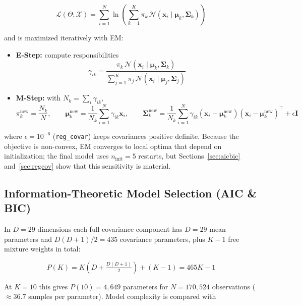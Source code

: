 \documentclass[11pt, a4paper]{article}
\begin{document}
\begin{equation}
\mathcal{L}(\Theta; \mathcal{X}) = \sum_{i=1}^{N} \ln \left( \sum_{k=1}^{K} \pi_k \, \mathcal{N}(\mathbf{x}_i \mid \boldsymbol{\mu}_k, \boldsymbol{\Sigma}_k) \right)
\end{equation}

and is maximized iteratively with EM:
\begin{itemize}
    \item \textbf{E-Step:} compute responsibilities
    \begin{equation}
    \gamma_{ik} = \frac{\pi_k \, \mathcal{N}(\mathbf{x}_i \mid \boldsymbol{\mu}_k, \boldsymbol{\Sigma}_k)}{\sum_{j=1}^{K} \pi_j \, \mathcal{N}(\mathbf{x}_i \mid \boldsymbol{\mu}_j, \boldsymbol{\Sigma}_j)}
    \end{equation}
    \item \textbf{M-Step:} with $N_k = \sum_i \gamma_{ik}$,
    \begin{equation}
    \pi_k^{\text{new}} = \frac{N_k}{N}, \qquad \boldsymbol{\mu}_k^{\text{new}} = \frac{1}{N_k} \sum_{i=1}^{N} \gamma_{ik} \mathbf{x}_i, \qquad \boldsymbol{\Sigma}_k^{\text{new}} = \frac{1}{N_k} \sum_{i=1}^{N} \gamma_{ik} (\mathbf{x}_i - \boldsymbol{\mu}_k^{\text{new}})(\mathbf{x}_i - \boldsymbol{\mu}_k^{\text{new}})^{\top} + \epsilon \mathbf{I}
    \end{equation}
\end{itemize}
where $\epsilon = 10^{-6}$ (\texttt{reg\_covar}) keeps covariances positive definite. Because the objective is non-convex, EM converges to local optima that depend on initialization; the final model uses $n_{\text{init}} = 5$ restarts, but Sections~\ref{sec:aicbic} and~\ref{sec:regcov} show that this sensitivity is material.

\subsection{Information-Theoretic Model Selection (AIC \& BIC)}
In $D = 29$ dimensions each full-covariance component has $D = 29$ mean parameters and $D(D+1)/2 = 435$ covariance parameters, plus $K-1$ free mixture weights in total:

\begin{equation}
P(K) = K \left( D + \tfrac{D(D+1)}{2} \right) + (K - 1) = 465K - 1
\end{equation}

At $K = 10$ this gives $P(10) = 4{,}649$ parameters for $N = 170{,}524$ observations ($\approx 36.7$ samples per parameter). Model complexity is compared with
\end{document}
